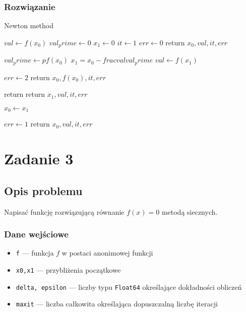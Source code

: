 \documentclass{article}
\begin{document}
\subsubsection*{Rozwiązanie}
	\begin{algorithm}[H]
	\caption{Newton method}
	\begin{algorithmic}
		\State $val \gets f(x_0)$
        \State $val_prime \gets 0$
        \State $x_1 \gets 0$
        \State $it \gets 1$
        	\State $err \gets 0$
        	\State return $x_0, val, it, err$
        \EndIf

        	\State $val_prime \gets pf(x_0)$
        	\State $x_1 = x_0 - frac{val}{val_prime}$
        	\State $val \gets f(x_1)$

        		\State $err \gets 2$
        		\State return $x_0, f(x_0), it, err$
        	\EndIf

        		\State return return $x_1, val, it, err$
        	\EndIf

        	\State $x_0 \gets x_1$
        \EndFor

        \State $err \gets 1$
        \State return $x_0, val, it, err$
    \end{algorithmic}
    \end{algorithm}
\clearpage

\section*{Zadanie 3}
\subsection*{Opis problemu}
	Napisać funkcję rozwiązującą równanie $f(x) = 0$ metodą siecznych.
\subsubsection*{Dane wejściowe}
	\begin{itemize}
	    \item \texttt{f} — funkcja $f$ w postaci anonimowej funkcji
	    \item \texttt{x0,x1} — przybliżenia początkowe
	    \item \texttt{delta, epsilon} — liczby typu \texttt{Float64} określające dokładności obliczeń
	    \item \texttt{maxit} — liczba całkowita określająca dopuszczalną liczbę iteracji
	\end{itemize}
\end{document}
